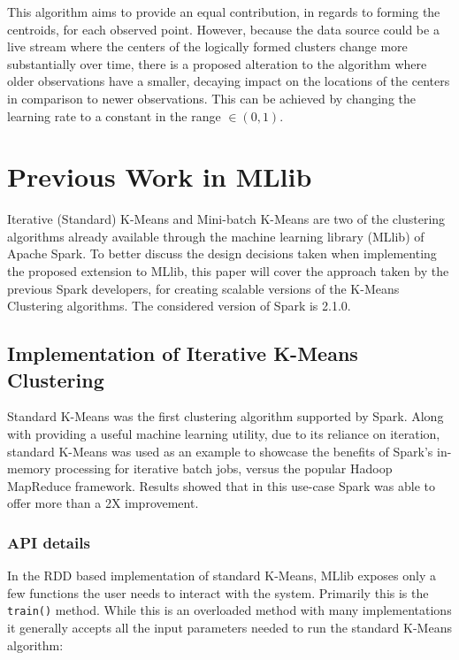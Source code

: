 \documentclass{l4proj}
\begin{document}
This algorithm aims to provide an equal contribution, in regards to forming the centroids, for each observed point. However, because the data source could be a live stream where the centers of the logically formed clusters change more substantially over time, there is a proposed alteration to the algorithm where older observations have a smaller, decaying impact on the locations of the centers in comparison to newer observations\cite{Non-Stationary}. This can be achieved by changing the learning rate to a constant in the range $\in (0,1)$.


\chapter{Previous Work in MLlib}
\label{previous}

Iterative (Standard) K-Means and Mini-batch K-Means are two of the clustering algorithms already available through the machine learning library (MLlib) of Apache Spark. To better discuss the design decisions taken when implementing the proposed extension to MLlib, this paper will cover the approach taken by the previous Spark developers, for creating scalable versions of the K-Means Clustering algorithms. The considered version of Spark is 2.1.0.

\section{Implementation of Iterative K-Means Clustering}

Standard K-Means was the first clustering algorithm supported by Spark. Along with providing a useful machine learning utility, due to its reliance on iteration, standard K-Means was used as an example to showcase the benefits of Spark's in-memory processing for iterative batch jobs, versus the popular Hadoop MapReduce framework. Results showed that in this use-case Spark was able to offer more than a 2X improvement\cite{Comparison}.

\subsection{API details}

In the RDD based implementation of standard K-Means, MLlib exposes only a few functions the user needs to interact with the system. Primarily this is the \texttt{train()} method. While this is an overloaded method with many implementations it generally accepts all the input parameters needed to run the standard K-Means algorithm:
\end{document}
